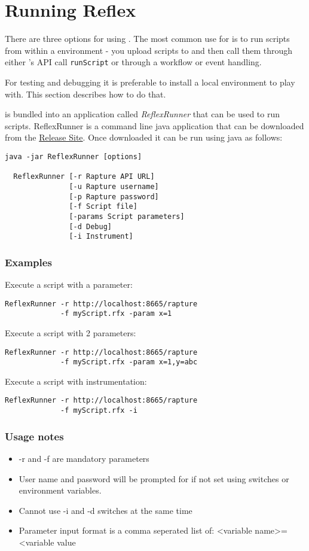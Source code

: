 \chapter{Running Reflex}
There are three options for using \Reflex. The most common use for \Reflex is to run scripts from within a \Rapture environment - you upload scripts to \Rapture and then call them through either \Rapture's API call \Verb+runScript+ or through a \Rapture workflow or event handling.

For testing and debugging it is preferable to install a local environment to play with. This section describes how to do that.

\Reflex is bundled into an application called \emph{ReflexRunner} that can be used to run \Reflex scripts. ReflexRunner is a command line java application that can be downloaded from the \href{http://incapture.github.com/RaptureRepo/release}{\Rapture Release Site}. Once downloaded it can be run using java as follows:

\begin{Verbatim}[fontsize=\small]
  java -jar ReflexRunner [options]

  ReflexRunner [-r Rapture API URL]
               [-u Rapture username]
               [-p Rapture password]
               [-f Script file]
               [-params Script parameters]
               [-d Debug]
               [-i Instrument]
\end{Verbatim}

\subsection{Examples}

Execute a script with a parameter:
\begin{Verbatim}
ReflexRunner -r http://localhost:8665/rapture
             -f myScript.rfx -param x=1
\end{Verbatim}
Execute a script with 2 parameters:
\begin{Verbatim}
ReflexRunner -r http://localhost:8665/rapture
             -f myScript.rfx -param x=1,y=abc
\end{Verbatim}
Execute a script with instrumentation:
\begin{Verbatim}
ReflexRunner -r http://localhost:8665/rapture
             -f myScript.rfx -i
\end{Verbatim}

\subsection{Usage notes}
\begin{itemize}
\item{-r and -f are mandatory parameters}
\item{User name and password will be prompted for if not set using switches or environment variables.}
\item{Cannot use -i and -d switches at the same time}
\item{Parameter input format is a comma seperated list of: <variable name>=<variable value}
\end{itemize}

